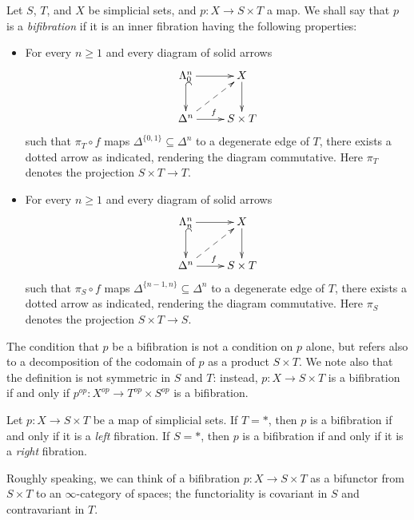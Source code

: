\begin{definition}\label{biv}
Let $S$, $T$, and $X$ be simplicial sets, and $p: X \rightarrow S
\times T$ a map. We shall say that $p$ is a {\it bifibration} if it is an inner fibration having the following
properties:

\begin{itemize}
\item For every $n\geq 1$ and every diagram of solid arrows
$$ \xymatrix{ \Lambda^n_0 \ar@{^{(}->}[d] \ar[r] & X \ar[d] \\
\Delta^n \ar@{-->}[ur] \ar[r]^{f} & S \times T}$$
such that $\pi_T \circ f$ maps $\Delta^{ \{0,1\} } \subseteq \Delta^n$ to a degenerate edge
of $T$, there exists a dotted arrow as indicated, rendering the diagram commutative. 
Here $\pi_T$ denotes the projection $S \times T \rightarrow T$.

\item For every $n\geq 1$ and every diagram of solid arrows
$$ \xymatrix{ \Lambda^n_n \ar@{^{(}->}[d] \ar[r] & X \ar[d] \\
\Delta^n \ar@{-->}[ur] \ar[r]^{f} & S \times T}$$
such that $\pi_S \circ f$ maps $\Delta^{ \{n-1,n\} } \subseteq \Delta^n$ to a degenerate edge
of $T$, there exists a dotted arrow as indicated, rendering the diagram commutative. 
Here $\pi_S$ denotes the projection $S \times T \rightarrow S$.

\end{itemize}
\end{definition}

\begin{remark}
The condition that $p$ be a bifibration is not a condition on $p$ alone, but refers also to a decomposition of the codomain of $p$ as a product $S \times T$. We note also that the definition is not symmetric in $S$ and $T$: instead, $p: X \rightarrow S \times T$ is a bifibration if and only if $p^{op}: X^{op} \rightarrow T^{op} \times S^{op}$ is a bifibration.
\end{remark}

\begin{remark}
Let $p: X \rightarrow S \times T$ be a map of simplicial sets. If $T = \ast$, then $p$ is a bifibration if and only if it is a {\em left} fibration. If $S = \ast$, then $p$ is a bifibration if and only if it is a {\em right} fibration.
\end{remark}

Roughly speaking, we can think of a bifibration $p: X \rightarrow S \times T$ as a bifunctor from $S \times T$ to an $\infty$-category of spaces; the functoriality is covariant in $S$ and contravariant in $T$.

